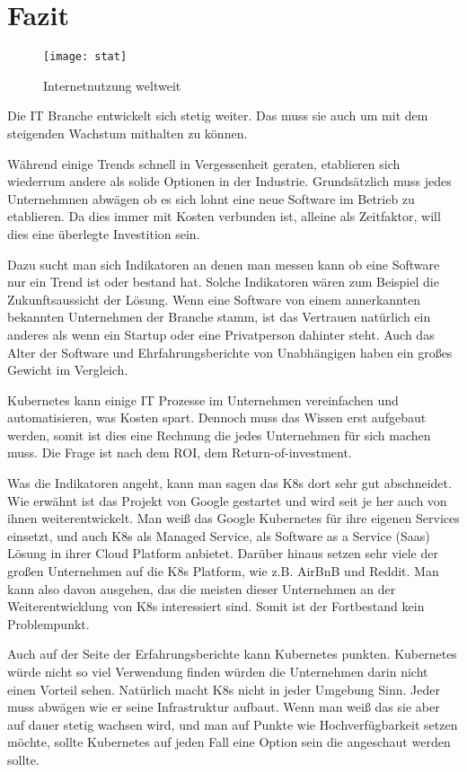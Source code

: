 \newpage
\section{Fazit}

\begin{figure}[H]
\caption{Internetnutzung weltweit}
\texttt{[image: stat]}
\\
\cite[][27.03.2020]{Quelle: https://bit.ly/2TogWCc}
\end{figure}

Die IT Branche entwickelt sich stetig weiter. Das muss sie auch um mit dem steigenden Wachstum mithalten zu können.

Während einige Trends schnell in Vergessenheit geraten, etablieren sich wiederrum andere als solide Optionen in der Industrie.
Grundsätzlich muss jedes Unternehmnen abwägen ob es sich lohnt eine neue Software im Betrieb zu etablieren. Da dies immer mit Kosten verbunden ist, alleine als Zeitfaktor, 
will dies eine überlegte Investition sein.

Dazu sucht man sich Indikatoren an denen man messen kann ob eine Software nur ein Trend ist oder bestand hat. Solche Indikatoren wären zum Beispiel die Zukunftsaussicht der Lösung.
Wenn eine Software von einem annerkannten bekannten Unternehmen der Branche stamm, ist das Vertrauen natürlich ein anderes als wenn ein Startup oder eine Privatperson dahinter steht.
Auch das Alter der Software und Ehrfahrungsberichte von Unabhängigen haben ein großes Gewicht im Vergleich.

Kubernetes kann einige IT Prozesse im Unternehmen vereinfachen und automatisieren, was Kosten spart. Dennoch muss das Wissen erst aufgebaut werden, somit ist dies eine Rechnung die jedes Unternehmen
für sich machen muss. Die Frage ist nach dem ROI, dem Return-of-investment.

Was die Indikatoren angeht, kann man sagen das K8s dort sehr gut abschneidet. Wie erwähnt ist das Projekt von Google gestartet und wird seit je her auch von ihnen weiterentwickelt.
Man weiß das Google Kubernetes für ihre eigenen Services einsetzt, und auch K8s als Managed Service, als Software as a Service (Saas) Lösung in ihrer Cloud Platform anbietet.
Darüber hinaus setzen sehr viele der großen Unternehmen auf die K8s Platform, wie z.B. AirBnB und Reddit. Man kann also davon ausgehen, das die meisten dieser Unternehmen an
der Weiterentwicklung von K8s interessiert sind. Somit ist der Fortbestand kein Problempunkt.

Auch auf der Seite der Erfahrungsberichte kann Kubernetes punkten. Kubernetes würde nicht so viel Verwendung finden würden die Unternehmen darin nicht einen Vorteil sehen.
Natürlich macht K8s nicht in jeder Umgebung Sinn. Jeder muss abwägen wie er seine Infrastruktur aufbaut. Wenn man weiß das sie aber auf dauer stetig wachsen wird,
und man auf Punkte wie Hochverfügbarkeit setzen möchte, sollte Kubernetes auf jeden Fall eine Option sein die angeschaut werden sollte.